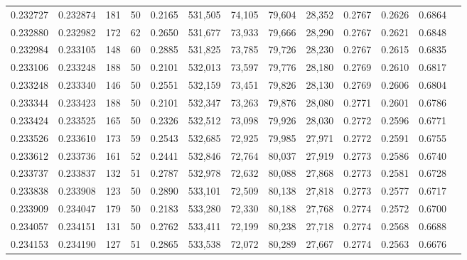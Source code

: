\begin{tabular}{rrrrrrrrrrrrr}
0.232727 & 0.232874 &   181 &  50 &                                     0.2165 & 531,505 &  74,105 &  79,604 &  28,352 & 0.2767 & 0.2626 & 0.6864 \\
0.232880 & 0.232982 &   172 &  62 &                                     0.2650 & 531,677 &  73,933 &  79,666 &  28,290 & 0.2767 & 0.2621 & 0.6848 \\
0.232984 & 0.233105 &   148 &  60 &                                     0.2885 & 531,825 &  73,785 &  79,726 &  28,230 & 0.2767 & 0.2615 & 0.6835 \\
0.233106 & 0.233248 &   188 &  50 &                                     0.2101 & 532,013 &  73,597 &  79,776 &  28,180 & 0.2769 & 0.2610 & 0.6817 \\
0.233248 & 0.233340 &   146 &  50 &                                     0.2551 & 532,159 &  73,451 &  79,826 &  28,130 & 0.2769 & 0.2606 & 0.6804 \\
0.233344 & 0.233423 &   188 &  50 &                                     0.2101 & 532,347 &  73,263 &  79,876 &  28,080 & 0.2771 & 0.2601 & 0.6786 \\
0.233424 & 0.233525 &   165 &  50 &                                     0.2326 & 532,512 &  73,098 &  79,926 &  28,030 & 0.2772 & 0.2596 & 0.6771 \\
0.233526 & 0.233610 &   173 &  59 &                                     0.2543 & 532,685 &  72,925 &  79,985 &  27,971 & 0.2772 & 0.2591 & 0.6755 \\
0.233612 & 0.233736 &   161 &  52 &                                     0.2441 & 532,846 &  72,764 &  80,037 &  27,919 & 0.2773 & 0.2586 & 0.6740 \\
0.233737 & 0.233837 &   132 &  51 &                                     0.2787 & 532,978 &  72,632 &  80,088 &  27,868 & 0.2773 & 0.2581 & 0.6728 \\
0.233838 & 0.233908 &   123 &  50 &                                     0.2890 & 533,101 &  72,509 &  80,138 &  27,818 & 0.2773 & 0.2577 & 0.6717 \\
0.233909 & 0.234047 &   179 &  50 &                                     0.2183 & 533,280 &  72,330 &  80,188 &  27,768 & 0.2774 & 0.2572 & 0.6700 \\
0.234057 & 0.234151 &   131 &  50 &                                     0.2762 & 533,411 &  72,199 &  80,238 &  27,718 & 0.2774 & 0.2568 & 0.6688 \\
0.234153 & 0.234190 &   127 &  51 &                                     0.2865 & 533,538 &  72,072 &  80,289 &  27,667 & 0.2774 & 0.2563 & 0.6676 \\

\end{tabular}
